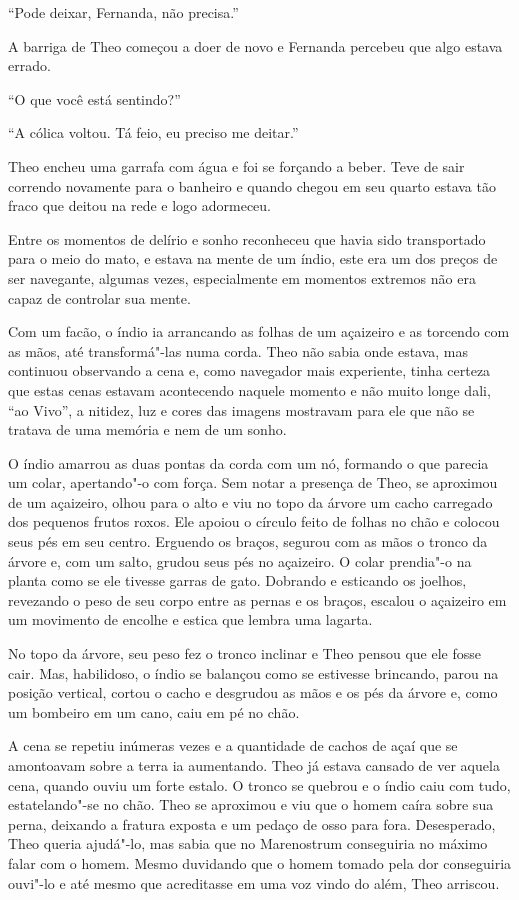 ``Pode deixar, Fernanda, não precisa.''

A barriga de Theo começou a doer de novo e Fernanda percebeu que algo
estava errado.

``O que você está sentindo?''

``A cólica voltou. Tá feio, eu preciso me deitar.''

Theo encheu uma garrafa com água e foi se forçando a beber. Teve de sair
correndo novamente para o banheiro e quando chegou em seu quarto estava
tão fraco que deitou na rede e logo adormeceu.

Entre os momentos de delírio e sonho reconheceu que havia sido
transportado para o meio do mato, e estava na mente de um índio, este
era um dos preços de ser navegante, algumas vezes, especialmente em
momentos extremos não era capaz de controlar sua mente.

Com um facão, o índio ia arrancando as folhas de um açaizeiro e as
torcendo com as mãos, até transformá"-las numa corda. Theo não sabia onde
estava, mas continuou observando a cena e, como navegador mais
experiente, tinha certeza que estas cenas estavam acontecendo naquele
momento e não muito longe dali, ``ao Vivo'', a nitidez, luz e cores das
imagens mostravam para ele que não se tratava de uma memória e nem de um
sonho.

O índio amarrou as duas pontas da corda com um nó, formando o que
parecia um colar, apertando"-o com força. Sem notar a presença de Theo,
se aproximou de um açaizeiro, olhou para o alto e viu no topo da árvore
um cacho carregado dos pequenos frutos roxos. Ele apoiou o círculo feito
de folhas no chão e colocou seus pés em seu centro. Erguendo os braços,
segurou com as mãos o tronco da árvore e, com um salto, grudou seus pés
no açaizeiro. O colar prendia"-o na planta como se ele tivesse garras de
gato. Dobrando e esticando os joelhos, revezando o peso de seu corpo
entre as pernas e os braços, escalou o açaizeiro em um movimento de
encolhe e estica que lembra uma lagarta.

No topo da árvore, seu peso fez o tronco inclinar e Theo pensou que ele
fosse cair. Mas, habilidoso, o índio se balançou como se estivesse
brincando, parou na posição vertical, cortou o cacho e desgrudou as mãos
e os pés da árvore e, como um bombeiro em um cano, caiu em pé no chão.

A cena se repetiu inúmeras vezes e a quantidade de cachos de açaí que se
amontoavam sobre a terra ia aumentando. Theo já estava cansado de ver
aquela cena, quando ouviu um forte estalo. O tronco se quebrou e o índio
caiu com tudo, estatelando"-se no chão. Theo se aproximou e viu que o
homem caíra sobre sua perna, deixando a fratura exposta e um pedaço de
osso para fora. Desesperado, Theo queria ajudá"-lo, mas sabia que no
Marenostrum conseguiria no máximo falar com o homem. Mesmo duvidando que
o homem tomado pela dor conseguiria ouvi"-lo e até mesmo que acreditasse
em uma voz vindo do além, Theo arriscou.

